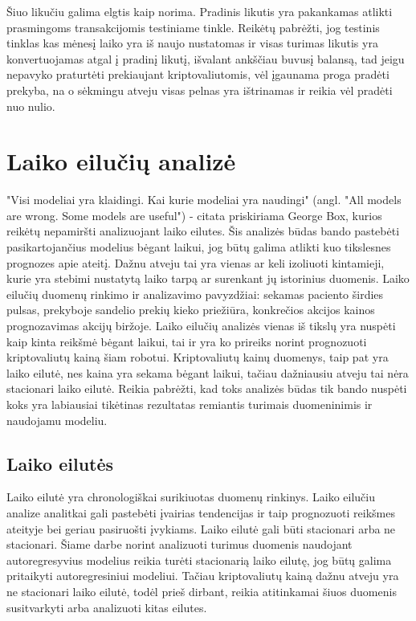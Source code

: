 \documentclass{VUMIFInfKursinis}
\begin{document}
Šiuo likučiu galima elgtis kaip norima. Pradinis likutis yra pakankamas atlikti prasmingoms transakcijomis testiniame tinkle. Reikėtų pabrėžti, jog testinis
tinklas kas mėnesį laiko yra iš naujo nustatomas ir visas turimas likutis yra konvertuojamas atgal į pradinį likutį, išvalant ankščiau buvusį balansą, tad jeigu
nepavyko praturtėti prekiaujant kriptovaliutomis, vėl įgaunama proga pradėti prekyba, na o sėkmingu atveju visas pelnas yra ištrinamas ir reikia vėl pradėti
nuo nulio.

\section{Laiko eilučių analizė}
"Visi modeliai yra klaidingi. Kai kurie modeliai yra naudingi" (angl. "All models are wrong. Some models are useful") - citata priskiriama George Box, kurios
reikėtų nepamiršti analizuojant laiko eilutes. Šis analizės būdas bando pastebėti pasikartojančius modelius bėgant laikui, jog būtų galima atlikti kuo tikslesnes
prognozes apie ateitį. 
Dažnu atveju tai yra vienas ar keli izoliuoti kintamieji, kurie yra stebimi nustatytą laiko tarpą ar surenkant jų istorinius duomenis. Laiko eilučių duomenų 
rinkimo ir analizavimo pavyzdžiai: sekamas paciento širdies pulsas, prekyboje sandelio prekių kieko priežiūra, konkrečios akcijos kainos prognozavimas akcijų biržoje. 
Laiko eilučių analizės vienas iš tikslų yra nuspėti kaip kinta reikšmė bėgant laikui, tai ir yra ko prireiks norint prognozuoti kriptovaliutų kainą šiam robotui. 
Kriptovaliutų kainų duomenys, taip pat yra laiko eilutė, nes kaina yra sekama bėgant laikui, tačiau dažniausiu atveju tai nėra stacionari laiko eilutė.
Reikia pabrėžti, kad toks analizės būdas tik bando nuspėti koks yra labiausiai tikėtinas rezultatas remiantis turimais duomeninimis ir naudojamu modeliu. 

\subsection {Laiko eilutės}
Laiko eilutė yra chronologiškai surikiuotas duomenų rinkinys. Laiko eilučiu analize analitkai gali pastebėti įvairias tendencijas ir taip prognozuoti reikšmes
ateityje bei geriau pasiruošti įvykiams. Laiko eilutė gali būti stacionari arba ne stacionari. Šiame darbe norint analizuoti turimus duomenis naudojant 
autoregresyvius modelius reikia turėti stacionarią laiko eilutę, jog būtų galima pritaikyti autoregresiniui modeliui. Tačiau kriptovaliutų kainą dažnu atveju yra
ne stacionari laiko eilutė, todėl prieš dirbant, reikia atitinkamai šiuos duomenis susitvarkyti arba analizuoti kitas eilutes.
\end{document}
